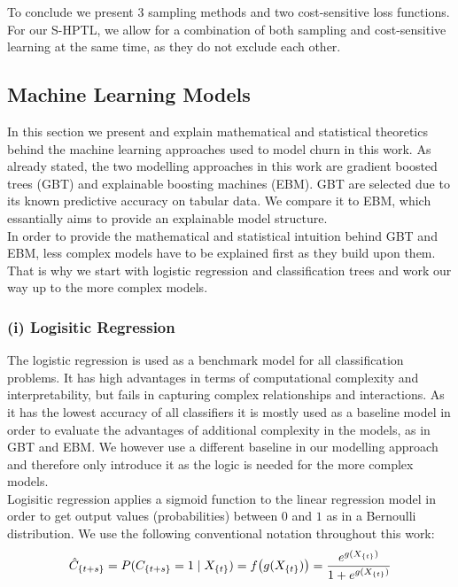 \documentclass[12pt,titlepage]{article}
\begin{document}
\noindent
To conclude we present 3 sampling methods and two cost-sensitive loss functions. For our S-HPTL, we allow for a combination of both sampling and cost-sensitive learning at the same time, as they do not exclude each other. \\


\subsection{Machine Learning Models} \par
\label{chap:mlmodels}

In this section we present and explain mathematical and statistical theoretics behind the machine learning approaches used to model churn in this work. As already stated, the two modelling approaches in this work are gradient boosted trees (GBT) and explainable boosting machines (EBM). GBT are selected due to its known predictive accuracy on tabular data. We compare it to EBM, which essantially aims to provide an explainable model structure. \\
In order to provide the mathematical and statistical intuition behind GBT and EBM, less complex models have to be explained first as they build upon them. That is why we start with logistic regression and classification trees and work our way up to the more complex models. \\

\subsubsection*{(i) Logisitic Regression}
The logistic regression is used as a benchmark model for all classification problems. It has high advantages in terms of computational complexity and interpretability, but fails in capturing complex relationships and interactions. As it has the lowest accuracy of all classifiers it is mostly used as a baseline model in order to evaluate the advantages of additional complexity in the models, as in GBT and EBM. We however use a different baseline in our modelling approach and therefore only introduce it as the logic is needed for the more complex models.\\
Logisitic regression applies a sigmoid function to the linear regression model in order to get output values (probabilities) between $0$ and $1$ as in a Bernoulli distribution. We use the following conventional notation throughout this work:
\vspace{5mm}
\noindent
\begin{equation} \label{bern_dist}
    \hat{C}_{\{t+s\}} = P(C_{\{t+s\}}=1\mid X_{\{t\}}) = f\big(g(X_{\{t\}})\big) = \frac{e^{g(X_{\{t\}})}}{1 + e^{g(X_{\{t\}})}} \\
\end{equation}
\vspace{1mm}
\end{document}
